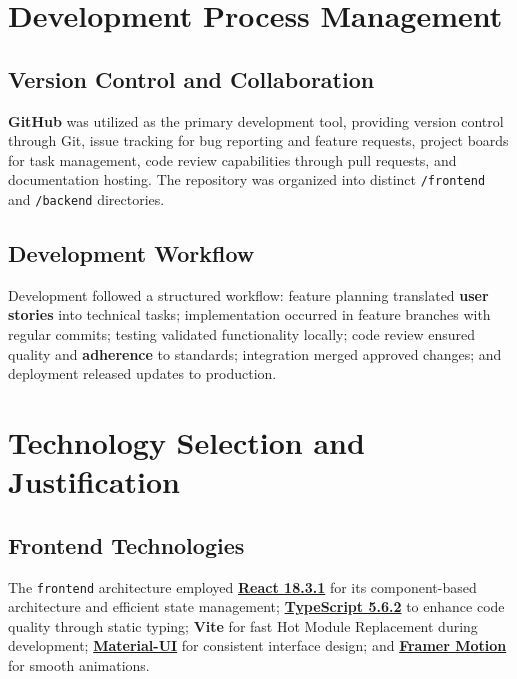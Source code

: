 \section{Development Process Management}

\subsection*{Version Control and Collaboration}

\textbf{GitHub} was utilized as the primary development tool, providing version control through Git, issue tracking for bug reporting and feature requests, project boards for task management, code review capabilities through pull requests, and documentation hosting. The repository was organized into distinct \texttt{/frontend} and \texttt{/backend} directories.

\subsection*{Development Workflow}

Development followed a structured workflow: feature planning translated \textbf{user stories} into technical tasks; implementation occurred in feature branches with regular commits; testing validated functionality locally; code review ensured quality and \textbf{adherence} to standards; integration merged approved changes; and deployment released updates to production.

\section{Technology Selection and Justification}

\subsection*{Frontend Technologies}

The \texttt{frontend} architecture employed \href{https://18.react.dev/}{\textbf{React 18.3.1}} for its component-based architecture and efficient state management; \href{https://www.typescriptlang.org/docs/handbook/release-notes/typescript-5-6.html}{\textbf{TypeScript 5.6.2}} to enhance code quality through static typing; \textbf{Vite} for fast Hot Module Replacement during development; \href{https://mui.com/material-ui/}{\textbf{Material-UI}} for consistent interface design; and \href{https://motion.dev/docs/react}{\textbf{Framer Motion}} for smooth animations.

